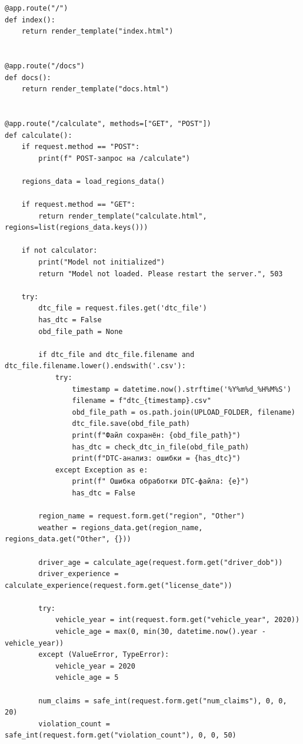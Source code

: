 \begin{lstlisting}[caption={Реализация эндпоинтов Flask}, label={lst:routes}    breaklines=true,
    breakatwhitespace=true,
    breakindent=10pt,
    columns=fullflexible
]
@app.route("/")
def index():
    return render_template("index.html")


@app.route("/docs")
def docs():
    return render_template("docs.html")


@app.route("/calculate", methods=["GET", "POST"])
def calculate():
    if request.method == "POST":
        print(f" POST-запрос на /calculate")
    
    regions_data = load_regions_data()

    if request.method == "GET":
        return render_template("calculate.html", regions=list(regions_data.keys()))

    if not calculator:
        print("Model not initialized")
        return "Model not loaded. Please restart the server.", 503
    
    try:
        dtc_file = request.files.get('dtc_file')
        has_dtc = False
        obd_file_path = None
        
        if dtc_file and dtc_file.filename and dtc_file.filename.lower().endswith('.csv'):
            try:
                timestamp = datetime.now().strftime('%Y%m%d_%H%M%S')
                filename = f"dtc_{timestamp}.csv"
                obd_file_path = os.path.join(UPLOAD_FOLDER, filename)
                dtc_file.save(obd_file_path)
                print(f"Файл сохранён: {obd_file_path}")
                has_dtc = check_dtc_in_file(obd_file_path)
                print(f"DTC-анализ: ошибки = {has_dtc}")
            except Exception as e:
                print(f" Ошибка обработки DTC-файла: {e}")
                has_dtc = False

        region_name = request.form.get("region", "Other")
        weather = regions_data.get(region_name, regions_data.get("Other", {}))

        driver_age = calculate_age(request.form.get("driver_dob"))
        driver_experience = calculate_experience(request.form.get("license_date"))

        try:
            vehicle_year = int(request.form.get("vehicle_year", 2020))
            vehicle_age = max(0, min(30, datetime.now().year - vehicle_year))
        except (ValueError, TypeError):
            vehicle_year = 2020
            vehicle_age = 5

        num_claims = safe_int(request.form.get("num_claims"), 0, 0, 20)
        violation_count = safe_int(request.form.get("violation_count"), 0, 0, 50)
        

\end{lstlisting}
